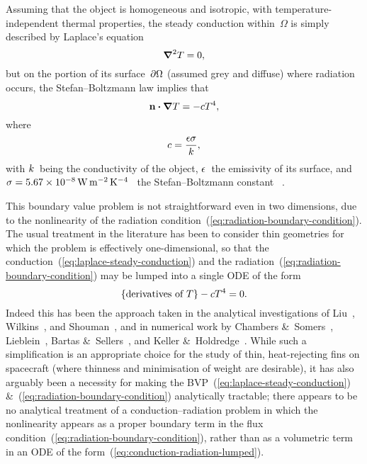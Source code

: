 Assuming that the object is homogeneous and isotropic,
with temperature-independent thermal properties,
the steady conduction within~$\Omega$
is simply described by Laplace's equation
\begin{equation}
  \mathop{}\!\boldsymbol{\mathbf{\nabla}}^2 T = 0,
  \label{eq:laplace-steady-conduction}
\end{equation}
but on the portion of its surface~$\mathop{}\!\partial \Omega$
(assumed grey and diffuse) where radiation occurs,
the Stefan--Boltzmann law implies that
\begin{equation}
  \mathop{}\!\boldsymbol{\mathbf{n}} \boldsymbol{\cdot} \mathop{}\!\boldsymbol{\mathbf{\nabla}} T = - c T^4,
  \label{eq:radiation-boundary-condition}
\end{equation}
where
\begin{equation}
  c = \frac{\epsilon \sigma}{k},
  \label{eq:radiation-constant}
\end{equation}
with $k$~being the conductivity of the object,
$\epsilon$~the emissivity of its surface,
and $\stefan = \SI{5.67e-8}{\watt \per\metre\squared \per\kelvin\tothe{4}}$~%
the Stefan--Boltzmann constant~%
\cite{tiesinga-2019-2018-codata-recommended-constants}.

This boundary value problem is not straightforward
even in two dimensions,
due to the nonlinearity of
the radiation condition~(\ref{eq:radiation-boundary-condition}).
The usual treatment in the literature has been to consider thin geometries
for which the problem is effectively one-dimensional,
so that the conduction~(\ref{eq:laplace-steady-conduction})
and the radiation~(\ref{eq:radiation-boundary-condition})
may be lumped into a single ODE of the form
\begin{equation}
  \left\{\textnormal{derivatives of~$T$}\right\} - c T^4 = 0.
  \label{eq:conduction-radiation-lumped}
\end{equation}
Indeed this has been the approach taken in the analytical investigations of
Liu~\cite{liu-1960-minimum-rectangular-radiating-fins},
Wilkins~\cite{
  wilkins-1960-minumum-mass-fins-radiation,
  wilkins-1961-minimum-mass-fins-thickness,
  wilkins-1962-minimum-mass-fins-gradients,
  wilkins-1974-optimum-shapes-convection-radiation
},
and
Shouman~\cite{shouman-1968-exact-radiation-convection-fin},
and in numerical work by
Chambers \&~Somers~\cite{chambers-1959-radiation-fin-efficiency-circular},
Lieblein~\cite{lieblein-1959-radiant-fin-constant-thickness},
Bartas \&~Sellers~\cite{bartas-1960-radiation-fin-effectiveness},
and
Keller \&~Holdredge~\cite{keller-1970-radiation-annular-fins-trapezoidal}.
While such a simplification is an appropriate choice
for the study of thin, heat-rejecting fins on spacecraft
(where thinness and minimisation of weight are desirable),
it has also arguably been a necessity
for making the BVP~(\ref{eq:laplace-steady-conduction})
\&~(\ref{eq:radiation-boundary-condition}) analytically tractable;
there appears to be no analytical treatment
of a conduction--radiation problem
in which the nonlinearity appears as a proper boundary term
in the flux condition~(\ref{eq:radiation-boundary-condition}),
rather than as a volumetric term in an ODE
of the form~(\ref{eq:conduction-radiation-lumped}).

